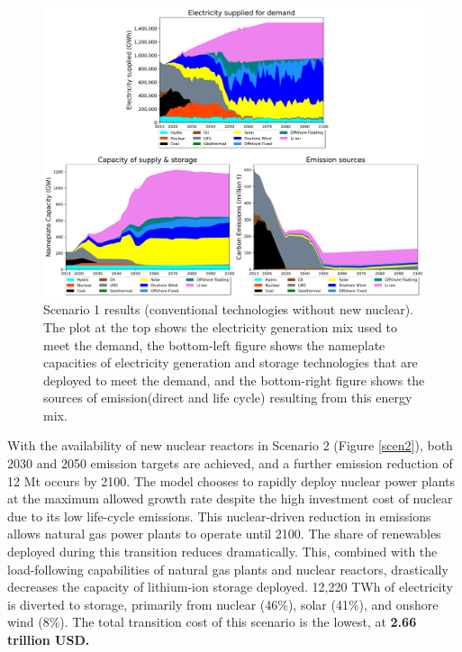 \begin{figure}[b!] 
\centering
\includegraphics[scale=0.5]{figures/conv_nonuc}
\caption{Scenario 1 results (conventional technologies without new nuclear). The plot at the top shows the electricity generation mix used to meet the demand, the bottom-left figure shows the nameplate capacities of electricity generation and storage technologies that are deployed to meet the demand, and the bottom-right figure shows the sources of emission(direct and life cycle) resulting from this energy mix.}
\label{scen1}
\end{figure}

With the availability of new nuclear reactors in Scenario 2 (Figure \ref{scen2}), both 2030 and 2050 emission targets are achieved, and a further emission reduction of 12 Mt occurs by 2100. The model chooses to rapidly deploy nuclear power plants at the maximum allowed growth rate despite the high investment cost of nuclear due to its low life-cycle emissions. This nuclear-driven reduction in emissions allows natural gas power plants to operate until 2100. The share of renewables deployed during this transition reduces dramatically. This, combined with the load-following capabilities of natural gas plants and nuclear reactors, drastically decreases the capacity of lithium-ion storage deployed. 12,220 TWh of electricity is diverted to storage, primarily from nuclear (46\%), solar (41\%), and onshore wind (8\%). The total transition cost of this scenario is the lowest, at \textbf{2.66 trillion USD.}


